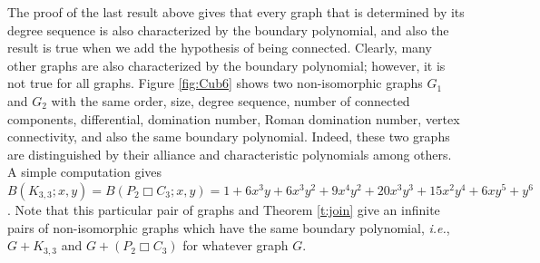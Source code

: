 \documentclass[review]{elsarticle}
\begin{document}
The proof of the last result above gives that every graph that is determined by its degree sequence is also characterized by the boundary polynomial, and also the result is true when we add the hypothesis of being connected. Clearly, many other graphs are also characterized by the boundary polynomial; however, it is not true for all graphs. 
Figure \ref{fig:Cub6} shows two non-isomorphic graphs $G_1$ and $G_2$ with the same order, size, degree sequence, number of connected components, differential, domination number, Roman domination number, vertex connectivity, and also the same boundary polynomial. Indeed, these two graphs are distinguished by their alliance and characteristic polynomials among others.
A simple computation gives $B(K_{3,3};x,y)=B(P_2\Box C_3;x,y)=1 + 6 x^3y + 6 x^3y^2 + 9 x^4y^2 + 20 x^3y^3 + 15 x^2y^4 + 6xy^5 +y^6$. Note that this particular pair of graphs and Theorem \ref{t:join} give an infinite pairs of non-isomorphic graphs which have the same boundary polynomial, \emph{i.e.}, $G+K_{3,3}$ and $G+(P_2\Box C_3)$ for whatever graph $G$. 
\end{document}

